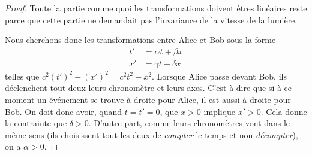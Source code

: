 \begin{proof}
	Toute la partie comme quoi les transformations doivent êtres linéaires reste parce que cette partie ne demandait pas l'invariance de la vitesse de la lumière. 
    
    Nous cherchons donc les transformations entre Alice et Bob sous la forme
	\[ 
	\begin{split}
		t'&=\alpha t+\beta x\\
		x'&=\gamma t+\delta x
	\end{split}  
	\]
	telles que $c^2(t')^2-(x')^2=c^2t^2-x^2$. Lorsque Alice passe devant Bob, ils déclenchent tout deux leurs chronomètre et leurs axes. C'est à dire que si à ce moment un événement se trouve à droite pour Alice, il est aussi à droite pour Bob. On doit donc avoir, quand $t=t'=0$, que $x>0$ implique $x'>0$. Cela donne la contrainte que $\delta>0$. D'autre part, comme leurs chronomètres vont dans le même sens (ils choisissent tout les deux de \emph{compter} le temps et non \emph{décompter}), on a $\alpha>0$.


\end{proof}
